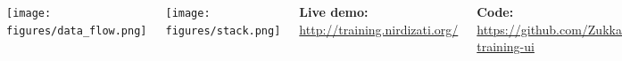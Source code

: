 \documentclass[24pt, a0paper, landscape]{tikzposter}
\begin{document}
\begin{columns}
{        \begin{tikzfigure}
   			\includegraphics{figures/scatter_plot.png}
		\end{tikzfigure}

        \begin{tikzfigure}
            \includegraphics[scale=0.65]{figures/model_overview.png}
        \end{tikzfigure}
        }

        {
        \begin{tikzfigure}
            \texttt{[image: figures/data\_flow.png]}
        \end{tikzfigure}

        \begin{tikzfigure}
            \texttt{[image: figures/stack.png]}
        \end{tikzfigure}
        }

        {
        	
       	\textbf{Live demo:} \href{http://training.nirdizati.org/}{\url{http://training.nirdizati.org/}}

        \bigbreak
        \textbf{Code:} \href{https://github.com/Zukkari/nirdizati-training-ui}{\url{https://github.com/Zukkari/nirdizati-training-ui}}
        
}
\end{columns}
\end{document}
